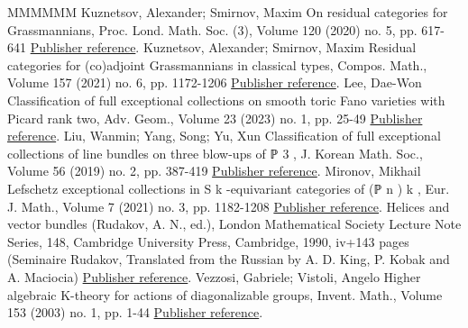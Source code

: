 \documentclass[11pt]{article}
\theoremstyle{definition}
\numberwithin{equation}{section}
\begin{document}
\begin{thebibliography}{MMMMMM}
 Kuznetsov, Alexander; Smirnov, Maxim On residual categories for Grassmannians, Proc. Lond. Math. Soc. (3), Volume 120 (2020) no. 5, pp. 617-641 \href{https://alco.centre-mersenne.org/articles/10.5802/alco.371/#resCatLMS}{Publisher reference}.
 Kuznetsov, Alexander; Smirnov, Maxim Residual categories for (co)adjoint Grassmannians in classical types, Compos. Math., Volume 157 (2021) no. 6, pp. 1172-1206 \href{https://alco.centre-mersenne.org/articles/10.5802/alco.371/#resCatCompositio}{Publisher reference}.
 Lee, Dae-Won Classification of full exceptional collections on smooth toric Fano varieties with Picard rank two, Adv. Geom., Volume 23 (2023) no. 1, pp. 25-49 \href{https://alco.centre-mersenne.org/articles/10.5802/alco.371/#pic2Fano}{Publisher reference}.
 Liu, Wanmin; Yang, Song; Yu, Xun Classification of full exceptional collections of line bundles on three blow-ups of ℙ 3 , J. Korean Math. Soc., Volume 56 (2019) no. 2, pp. 387-419 \href{https://alco.centre-mersenne.org/articles/10.5802/alco.371/#LiuYangYu}{Publisher reference}.
 Mironov, Mikhail Lefschetz exceptional collections in S k -equivariant categories of (ℙ n ) k , Eur. J. Math., Volume 7 (2021) no. 3, pp. 1182-1208 \href{https://alco.centre-mersenne.org/articles/10.5802/alco.371/#Mironov}{Publisher reference}.
 Helices and vector bundles (Rudakov, A. N., ed.), London Mathematical Society Lecture Note Series, 148, Cambridge University Press, Cambridge, 1990, iv+143 pages (Seminaire Rudakov, Translated from the Russian by A. D. King, P. Kobak and A. Maciocia) \href{https://alco.centre-mersenne.org/articles/10.5802/alco.371/#rudakov}{Publisher reference}.
 Vezzosi, Gabriele; Vistoli, Angelo Higher algebraic K-theory for actions of diagonalizable groups, Invent. Math., Volume 153 (2003) no. 1, pp. 1-44 \href{https://alco.centre-mersenne.org/articles/10.5802/alco.371/#vv}{Publisher reference}.
\end{thebibliography}
\end{document}
